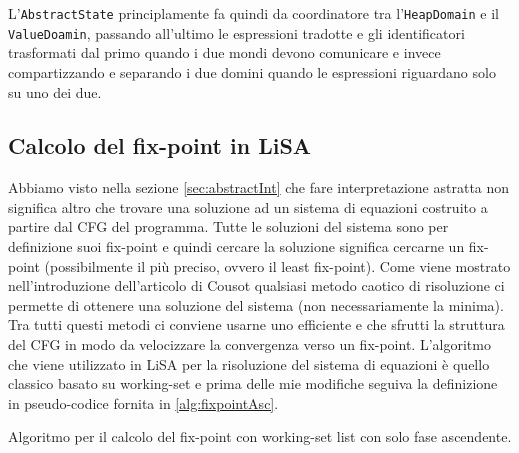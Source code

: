 L'\texttt{AbstractState} principlamente fa quindi da coordinatore tra l'\texttt{HeapDomain} e il \texttt{ValueDoamin}, passando all'ultimo le espressioni tradotte e gli identificatori trasformati dal primo quando i due mondi devono comunicare e invece compartizzando e separando i due domini quando le espressioni riguardano solo su uno dei due.

\subsection{Calcolo del fix-point in LiSA}\label{sec:fix-pointLiSA}
Abbiamo visto nella sezione \ref{sec:abstractInt} che fare interpretazione astratta non significa altro che trovare una soluzione ad un sistema di equazioni costruito a partire dal CFG del programma. Tutte le soluzioni del sistema sono per definizione suoi fix-point e quindi cercare la soluzione significa cercarne un fix-point (possibilmente il più preciso, ovvero il least fix-point). Come viene mostrato nell'introduzione dell'articolo di Cousot \cite{Cousot-IMAG-RR88-1977} qualsiasi metodo caotico di risoluzione ci permette di ottenere una soluzione del sistema (non necessariamente la minima). Tra tutti questi metodi ci conviene usarne uno efficiente e che sfrutti la struttura del CFG in modo da velocizzare la convergenza verso un fix-point. L'algoritmo che viene utilizzato in LiSA per la risoluzione del sistema di equazioni è quello classico basato su working-set e prima delle mie modifiche seguiva la definizione in pseudo-codice fornita in \ref{alg:fixpointAsc}.

\begin{algorithm}
	\caption{Algoritmo per il calcolo del fix-point con working-set list con solo fase ascendente.}
	\label{alg:fixpointAsc}
	\begin{algorithmic}[1]
		\Statex
        
                \Else
                \EndIf
            \EndIf
        \EndWhile
		\State {}
        
	\end{algorithmic}
\end{algorithm}

